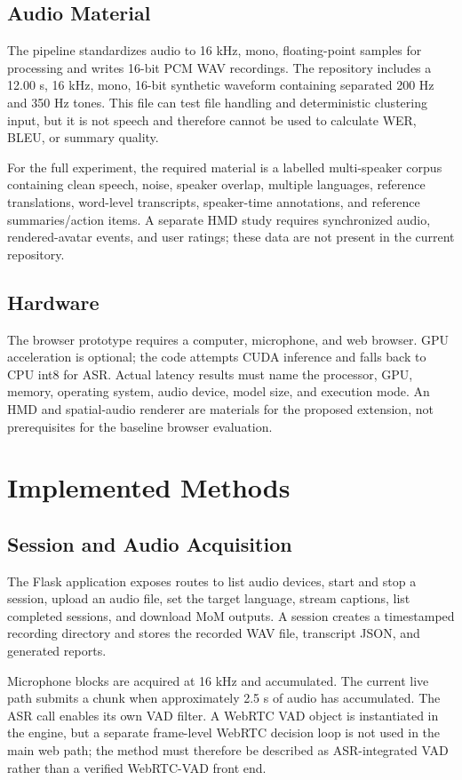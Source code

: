 \documentclass[conference]{IEEEtran}
\begin{document}
\subsection{Audio Material}
The pipeline standardizes audio to 16 kHz, mono, floating-point samples for processing and writes 16-bit PCM WAV recordings. The repository includes a 12.00 s, 16 kHz, mono, 16-bit synthetic waveform containing separated 200 Hz and 350 Hz tones. This file can test file handling and deterministic clustering input, but it is not speech and therefore cannot be used to calculate WER, BLEU, or summary quality.

For the full experiment, the required material is a labelled multi-speaker corpus containing clean speech, noise, speaker overlap, multiple languages, reference translations, word-level transcripts, speaker-time annotations, and reference summaries/action items. A separate HMD study requires synchronized audio, rendered-avatar events, and user ratings; these data are not present in the current repository.

\subsection{Hardware}
The browser prototype requires a computer, microphone, and web browser. GPU acceleration is optional; the code attempts CUDA inference and falls back to CPU int8 for ASR. Actual latency results must name the processor, GPU, memory, operating system, audio device, model size, and execution mode. An HMD and spatial-audio renderer are materials for the proposed extension, not prerequisites for the baseline browser evaluation.

\section{Implemented Methods}

\subsection{Session and Audio Acquisition}
The Flask application exposes routes to list audio devices, start and stop a session, upload an audio file, set the target language, stream captions, list completed sessions, and download MoM outputs. A session creates a timestamped recording directory and stores the recorded WAV file, transcript JSON, and generated reports.

Microphone blocks are acquired at 16 kHz and accumulated. The current live path submits a chunk when approximately 2.5 s of audio has accumulated. The ASR call enables its own VAD filter. A WebRTC VAD object is instantiated in the engine, but a separate frame-level WebRTC decision loop is not used in the main web path; the method must therefore be described as ASR-integrated VAD rather than a verified WebRTC-VAD front end.
\end{document}

